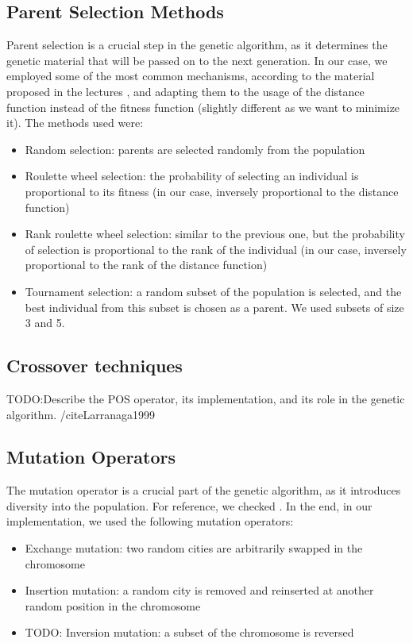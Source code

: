 \documentclass[12pt]{article}
\begin{document}
\subsection{Parent Selection Methods}
Parent selection is a crucial step in the genetic algorithm, as it determines the genetic material that will be passed on to the next generation. In our case, we employed some of the most common mechanisms, according to the material proposed in the lectures \cite{Belanche2024}, and adapting them to the usage of the distance function instead of the fitness function (slightly different as we want to minimize it). The methods used were:
\begin{itemize}
    \item Random selection: parents are selected randomly from the population
    \item Roulette wheel selection: the probability of selecting an individual is proportional to its fitness (in our case, inversely proportional to the distance function)
    \item Rank roulette wheel selection: similar to the previous one, but the probability of selection is proportional to the rank of the individual (in our case, inversely proportional to the rank of the distance function)
    \item Tournament selection: a random subset of the population is selected, and the best individual from this subset is chosen as a parent. We used subsets of size 3 and 5.
\end{itemize}


\subsection{Crossover techniques}
TODO:Describe the POS operator, its implementation, and its role in the genetic algorithm.
/cite{Larranaga1999}

\subsection{Mutation Operators}
The mutation operator is a crucial part of the genetic algorithm, as it introduces diversity into the population. For reference, we checked \cite{Larranaga1999}. In the end, in our implementation, we used the following mutation operators:
\begin{itemize}
    \item Exchange mutation: two random cities are arbitrarily swapped in the chromosome
    \item Insertion mutation: a random city is removed and reinserted at another random position in the chromosome
    \item TODO: Inversion mutation: a subset of the chromosome is reversed
\end{itemize}
\end{document}
